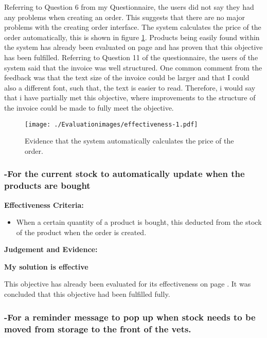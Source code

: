 Referring to Question 6 from my Questionnaire, the users did not say they had any problems when creating an order. This suggests that there are no major problems with the creating order interface. The system calculates the price of the order automatically, this is shown in figure \ref{fig:effectiveness-1}. Products being easily found within the system has already been evaluated on page \pageref{fig:search-evidence} and has proven that this objective has been fulfilled. Referring to Question 11 of the questionnaire, the users of the system said that the invoice was well structured. One common comment from the feedback was that the text size of the invoice could be larger and that I could also a different font, such that, the text is easier to read. Therefore, i would say that i have partially met this objective, where improvements to the structure of the invoice could be made to fully meet the objective.

\begin{figure}[H]
\caption{Evidence that the system automatically calculates the price of the order.} \label{fig:effectiveness-1}
\hfill\texttt{[image: ./Evaluationimages/effectiveness-1.pdf]}
\end{figure}





\pagebreak
\subsubsection{-For the current stock to automatically update when the products are bought}

\textbf{Effectiveness Criteria:}\newline
\begin{itemize}
	\item{When a certain quantity of a product is bought, this deducted from the stock of the product when the order is created.}
\end{itemize}
\textbf{Judgement and Evidence:} \newline

\textbf{\large{My solution is effective}}

This objective has already been evaluated for its effectiveness on page \pageref{stock-change-effectiveness}. It was concluded that this objective had been fulfilled fully.



\pagebreak
\subsubsection{-For a reminder message to pop up when stock needs to be moved from storage to the front of the vets. }

